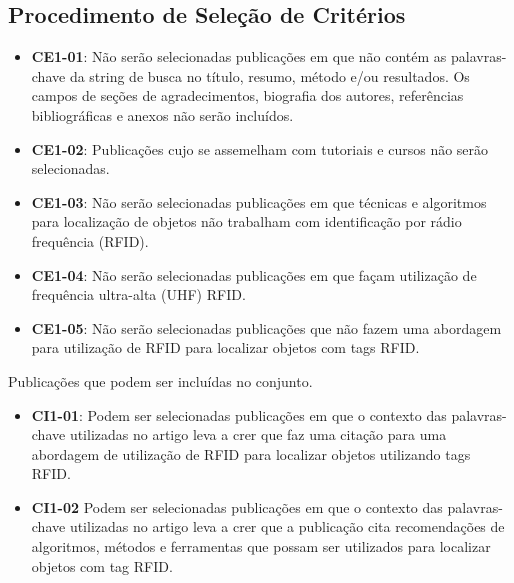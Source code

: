             
	\subsection{Procedimento de Seleção de Critérios}

	  		\begin{itemize}
      			\item \textbf{CE1-01}: Não serão selecionadas publicações em que não contém as  palavras-chave da string de busca no título, resumo, método  e/ou resultados. Os campos de seções de agradecimentos, biografia dos autores, referências bibliográficas e anexos não serão incluídos.

      			\item \textbf{CE1-02}: Publicações cujo se assemelham com  tutoriais e cursos não serão selecionadas.

      			\item \textbf{CE1-03}: Não serão selecionadas publicações em que técnicas e algoritmos  para localização de objetos não trabalham com identificação por rádio frequência (RFID).

      			\item \textbf{CE1-04}: Não serão selecionadas publicações em que façam utilização de frequência ultra-alta (UHF) RFID.

      			\item \textbf{CE1-05}:  Não serão selecionadas publicações que não fazem uma abordagem para utilização de RFID para localizar objetos com tags RFID.
    	\end{itemize}
	\par
	Publicações que podem ser incluídas no conjunto.

	\begin{itemize}
    	\item \textbf{CI1-01}: Podem ser selecionadas publicações em que o contexto das palavras-chave utilizadas no artigo leva a crer que faz uma citação para uma abordagem de utilização de RFID para localizar objetos utilizando tags RFID.
        \item \textbf{CI1-02} Podem ser selecionadas publicações em que o contexto das palavras-chave utilizadas no artigo leva a crer que a publicação cita recomendações de algoritmos, métodos e ferramentas que possam ser utilizados para localizar objetos com tag RFID.
    \end{itemize}